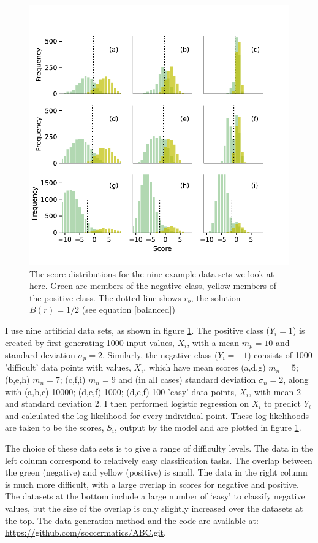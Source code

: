 \documentclass[preprint,12pt]{article}
\begin{document}
\begin{figure}[t]
\centering
\includegraphics[scale=1]{Figures/Distribution.pdf}
\caption{The score distributions for the nine example data sets we look at here. Green are members of the negative class, yellow members of the positive class. The dotted line shows $r_b$, the solution $B(r)=1/2$ (see equation \ref{balanced})} \label{fig:Distribution}
\end{figure}

I use nine artificial data sets, as shown in figure \ref{fig:Distribution}. The positive class ($Y_i=1$) is created by first generating 1000 input values, $X_i$, with a mean $m_p=10$ and standard deviation $\sigma_p=2$. Similarly, the negative class ($Y_i=-1$) consists of 1000 'difficult' data points with values, $X_i$, which have mean scores (a,d,g) $m_n=5$; (b,e,h) $m_n=7$; (c,f,i) $m_n=9$ and (in all cases) standard deviation $\sigma_n=2$, along with (a,b,c) 10000; (d,e,f) 1000; (d,e,f) 100 'easy' data points, $X_i$, with mean 2 and standard deviation 2.  I then performed logistic regression on $X_i$ to predict $Y_i$ and calculated the log-likelihood for every individual point. These log-likelihoods are taken to be the scores, $S_i$, output by the model and are plotted in figure \ref{fig:Distribution}. 

The choice of these data sets is to give a range of difficulty levels. The data in the left column correspond to relatively easy classification tasks. The overlap between the green (negative) and yellow (positive) is small. The data in the right column is much more difficult, with a large overlap in scores for negative and positive. The datasets at the bottom include a large number of `easy' to classify negative values, but the size of the overlap is only slightly increased over the datasets at the top. The data generation method and the code are available at: \href{https://github.com/soccermatics/ABC.git}{https://github.com/soccermatics/ABC.git}. 
\end{document}
